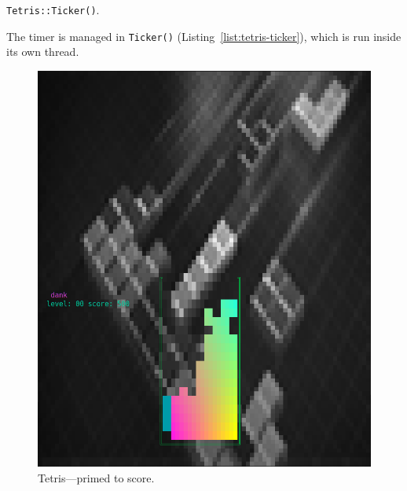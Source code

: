 \begin{listing}[!htb]
\inputminted[]{C}{code-tetris/ticker.h}
\caption{\texttt{Tetris::Ticker()}.}
\label{list:tetris-ticker}
\end{listing}

The timer is managed in \texttt{Ticker()} (Listing~\ref{list:tetris-ticker}),
which is run inside its own thread.

\begin{figure}
  \centering
  \begin{minipage}{0.45\textwidth}
    \includegraphics[width=1\linewidth]{media/tetris-prescore.png}
    \caption{Tetris---primed to score.}
  \end{minipage}\hfill
  \begin{minipage}{0.45\textwidth}

\end{minipage}
\end{figure}
